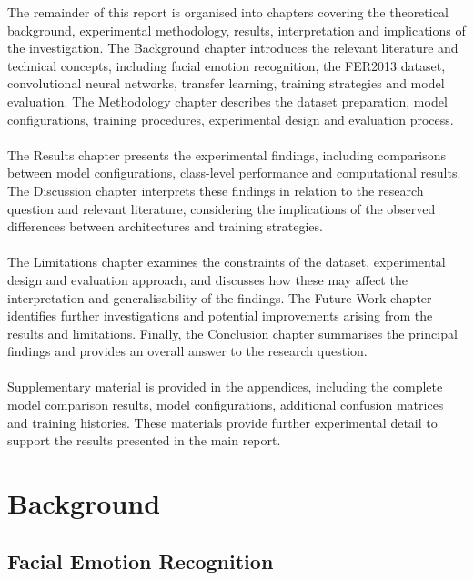 \documentclass[12pt, a4paper]{report}
\let\oldsection\section
\renewcommand{\section}{%
    \Needspace{6\baselineskip}%
    \oldsection
}
\begin{document}
			The remainder of this report is organised into chapters covering the theoretical background, experimental methodology, results, interpretation and implications of the investigation. The Background chapter introduces the relevant literature and technical concepts, including facial emotion recognition, the FER2013 dataset, convolutional neural networks, transfer learning, training strategies and model evaluation. The Methodology chapter describes the dataset preparation, model configurations, training procedures, experimental design and evaluation process.\\\\
			The Results chapter presents the experimental findings, including comparisons between model configurations, class-level performance and computational results. The Discussion chapter interprets these findings in relation to the research question and relevant literature, considering the implications of the observed differences between architectures and training strategies.\\\\
			The Limitations chapter examines the constraints of the dataset, experimental design and evaluation approach, and discusses how these may affect the interpretation and generalisability of the findings. The Future Work chapter identifies further investigations and potential improvements arising from the results and limitations. Finally, the Conclusion chapter summarises the principal findings and provides an overall answer to the research question.\\\\
			Supplementary material is provided in the appendices, including the complete model comparison results, model configurations, additional confusion matrices and training histories. These materials provide further experimental detail to support the results presented in the main report.
	
	\chapter{Background}
		
		\section{Facial Emotion Recognition}
			
\end{document}

